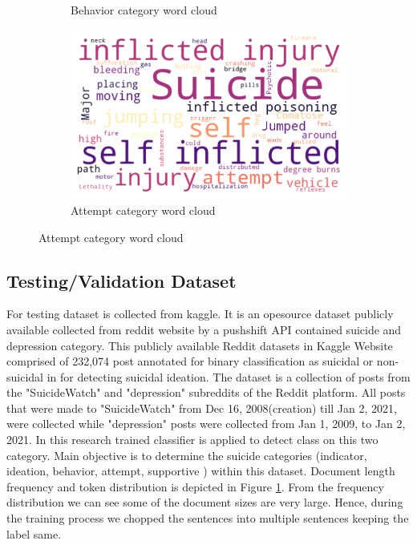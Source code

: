\documentclass[sn-mathphys,Numbered]{sn-jnl}%
\theoremstyle{thmstyleone}%
\theoremstyle{thmstyletwo}%
\theoremstyle{thmstylethree}%
\begin{document}
\begin{figure}[h!]
\begin{subfigure}{0.45\textwidth}
    \caption{Behavior category word cloud}
    \label{redditdist}
\end{subfigure}
\hfill
\begin{subfigure}{0.45\textwidth}
    \includegraphics[width=\textwidth]{Attempt_word_cloud.png}
    \caption{Attempt category word cloud}
    \label{twitterdist}
\end{subfigure}   
\label{redditdist_twitterdist}
\end{figure}

\subsection{Testing/Validation Dataset} 
For testing dataset is collected from kaggle. It is an opesource dataset publicly available collected from reddit website by a pushshift API contained suicide and depression category.  This publicly available Reddit datasets in Kaggle Website comprised of 232,074 post annotated for binary classification as suicidal or non-suicidal in \cite{aldhyani2022detecting} for detecting suicidal ideation. The dataset is a collection of posts from the "SuicideWatch" and "depression" subreddits of the Reddit platform. All posts that were made to "SuicideWatch" from Dec 16, 2008(creation) till Jan 2, 2021, were collected while "depression" posts were collected from Jan 1, 2009, to Jan 2, 2021. In this research trained classifier is applied to detect class on this two category. Main objective is to determine the suicide categories (indicator, ideation, behavior, attempt, supportive ) within this dataset. Document length frequency and token distribution is depicted in Figure \ref{redditdist}. From the frequency distribution we can see some of the document sizes are very large. Hence, during the training process we chopped the sentences into multiple sentences keeping the label same. 
\end{document}
